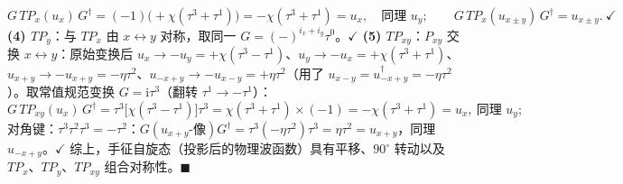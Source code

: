 \begin{equation*}
G\,TP_x(u_x)\,G^{\dagger}=(-1)\big(+\chi(\tau^3+\tau^1)\big)=-\chi(\tau^3+\tau^1)=u_x,\quad
\text{同理 }u_y;\qquad
G\,TP_x(u_{x\pm y})\,G^{\dagger}=u_{x\pm y}.\ \checkmark
\end{equation*}
\textbf{(4) $TP_y$}：与 $TP_x$ 由 $x\leftrightarrow y$ 对称，取同一 $G=(-)^{i_x+i_y}\tau^0$。$\checkmark$
\textbf{(5) $TP_{xy}$}：$P_{xy}$ 交换 $x\leftrightarrow y$：原始变换后 $u_x\to-u_y=+\chi(\tau^3-\tau^1)$、$u_y\to-u_x=+\chi(\tau^3+\tau^1)$、$u_{x+y}\to-u_{x+y}=-\eta\tau^2$、$u_{-x+y}\to-u_{x-y}=+\eta\tau^2$（用了 $u_{x-y}=u^{\dagger}_{-x+y}=-\eta\tau^2$）。取常值规范变换 $G=\mathrm{i}\tau^3$（翻转 $\tau^1\to-\tau^1$）：
\begin{equation*}
G\,TP_{xy}(u_x)\,G^{\dagger}=\tau^3\big[\chi(\tau^3-\tau^1)\big]\tau^3=\chi(\tau^3+\tau^1)\times(-1)= -\chi(\tau^3+\tau^1)=u_x,\ \text{同理 }u_y;
\end{equation*}
对角键：$\tau^3\tau^2\tau^3=-\tau^2$：$G(u_{x+y}\text{-像})G^{\dagger}=\tau^3(-\eta\tau^2)\tau^3=\eta\tau^2=u_{x+y}$，同理 $u_{-x+y}$。$\checkmark$
综上，手征自旋态（投影后的物理波函数）具有平移、$90^{\circ}$ 转动以及 $TP_x$、$TP_y$、$TP_{xy}$ 组合对称性。$\blacksquare$

